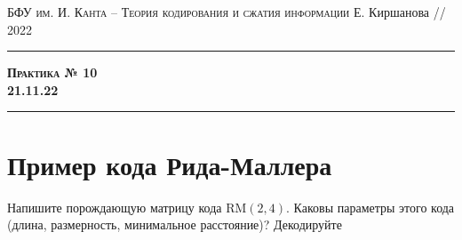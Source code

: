 \documentclass[11pt]{exam}
\theoremstyle{definition}
\begin{document}
	{\noindent
		\textsc{БФУ им. И. Канта -- Теория кодирования и сжатия информации}
		\hfill {Е. Киршанова // 2022\\}
	\hrule
	\begin{center}
		{\Large\textbf{
				\textsc{Практика № 10} \\[5pt] {21.11.22}
		} } 
	\end{center}
	\hrule \vspace{5mm}
	
	\thispagestyle{empty}
	
	\vspace{0.2cm}
	

	
%
		
	
%			
% 		
 		
 
\section{Пример кода Рида-Маллера}

\begin{questions}
	\question Напишите порождающую матрицу кода  $\mathrm{RM}(2,4)$. Каковы параметры этого кода (длина, размерность, минимальное расстояние)?
	\question Декодируйте
	

\end{questions}}
\end{document}
